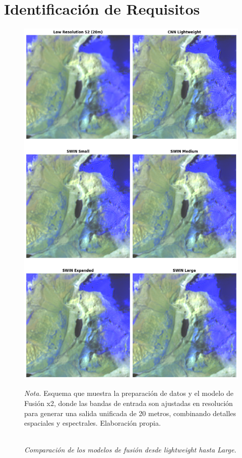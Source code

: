 \chapter{Identificación de Requisitos}

\begin{figure}[H] 
    \caption{\doublespacing \\ \textit{Comparación de los modelos de fusión desde lightweight hasta Large.}} 
    \centering
    \includegraphics[width=1\linewidth]{images/results10m.png}
    \begin{justify}
        \textit{Nota.} Esquema que muestra la preparación de datos y el modelo de Fusión x2, donde las bandas de entrada son ajustadas en resolución para generar una salida unificada de 20 metros, combinando detalles espaciales y espectrales. Elaboración propia.
    \end{justify}                    
    \label{fig:fusionx2_training}
\end{figure}
